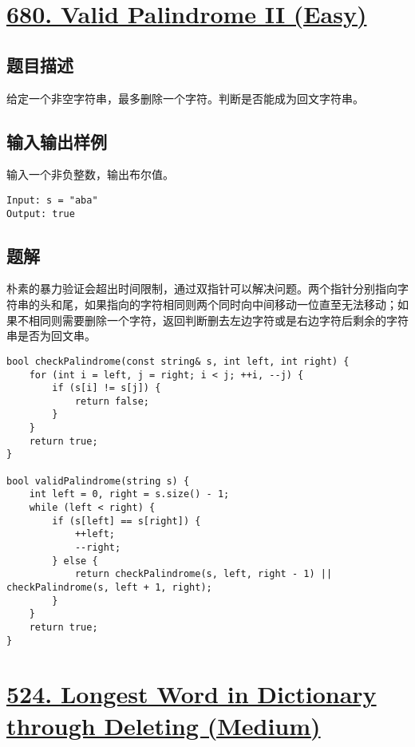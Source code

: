 \documentclass[lang=cn,10pt]{elegantbook}
\begin{document}
{\color{red}\section{\href{https://leetcode.cn/problems/valid-palindrome-ii/}{680. Valid Palindrome II (Easy)}}} \label{ch3.680}

\subsection*{题目描述}

给定一个非空字符串，最多删除一个字符。判断是否能成为回文字符串。

\subsection*{输入输出样例}

输入一个非负整数，输出布尔值。

\begin{lstlisting}
Input: s = "aba"
Output: true
\end{lstlisting}

\subsection*{题解}

朴素的暴力验证会超出时间限制，通过双指针可以解决问题。两个指针分别指向字符串的头和尾，如果指向的字符相同则两个同时向中间移动一位直至无法移动；如果不相同则需要删除一个字符，返回判断删去左边字符或是右边字符后剩余的字符串是否为回文串。

\begin{lstlisting}
bool checkPalindrome(const string& s, int left, int right) {
	for (int i = left, j = right; i < j; ++i, --j) {
		if (s[i] != s[j]) {
			return false;
		}
	}
	return true;
}

bool validPalindrome(string s) {
	int left = 0, right = s.size() - 1;
	while (left < right) {
		if (s[left] == s[right]) {
			++left;
			--right;
		} else {
			return checkPalindrome(s, left, right - 1) || checkPalindrome(s, left + 1, right);
		}
	}
	return true;
}
\end{lstlisting}

{\color{red}\section{\href{https://leetcode.cn/problems/longest-word-in-dictionary-through-deleting/}{524. Longest Word in Dictionary through Deleting (Medium)}}} \label{ch3.524}
\end{document}

